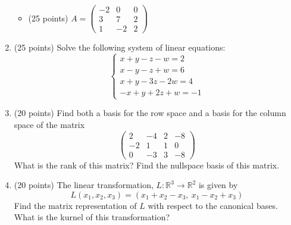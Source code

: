 \documentclass[fleqn]{article}
\begin{document}
\begin{enumerate}
\begin{itemize}
            


        \item (25 points) $A=\begin{pmatrix}
          -2 & 0 & 0
          \\
          3 & 7 & 2 
          \\
          1 & -2 & 2
        \end{pmatrix}$
      \end{itemize}

            


    \item (25 points) Solve the following system of linear equations:
    $$
      \begin{cases}
        x+y-z-w=2
        \\
        x-y-z+w=6
        \\
        x+y-3z-2w=4
        \\
        -x+y+2z+w=-1
      \end{cases}
    $$

            


    \item (20 points) Find both a basis for the row space and a basis for the column space of the matrix
    $$
      \begin{pmatrix}
        2 & -4 & 2 & -8
        \\
        -2 & 1 & 1 & 0
        \\
        0 & -3 & 3 & -8
      \end{pmatrix}
    $$
    What is the rank of this matrix? Find the nullspace basis of this matrix.

            


    \item (20 points) The linear transformation, $L:\mathbb{R}^3 \rightarrow \mathbb{R}^2$ is given by 
    $$
      L(x_1, x_2, x_3)=\left(x_1+x_2-x_3, ~ x_1-x_2+x_3\right)
    $$ 
    Find the matrix representation of $L$ with respect to the canonical bases. What is the kurnel
    of this transformation?

            


\end{enumerate}
\end{document}

